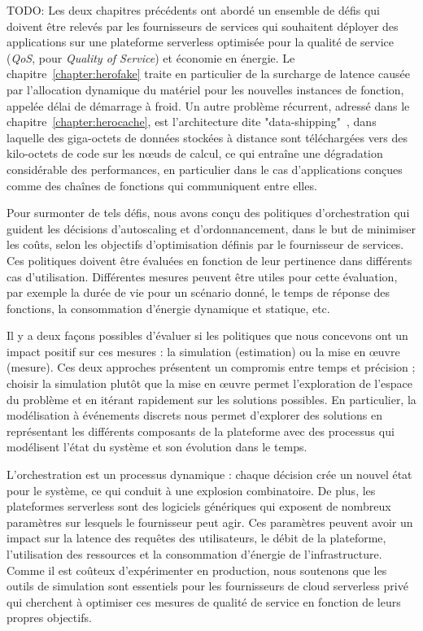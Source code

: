 TODO: Les deux chapitres précédents ont abordé un ensemble de défis qui doivent être relevés par les fournisseurs de services qui souhaitent déployer des applications sur une plateforme serverless optimisée pour la qualité de service (\textit{QoS}, pour \textit{Quality of Service}) et économie en énergie. Le chapitre~\ref{chapter:herofake} traite en particulier de la surcharge de latence causée par l'allocation dynamique du matériel pour les nouvelles instances de fonction, appelée délai de démarrage à froid. Un autre problème récurrent, adressé dans le chapitre~\ref{chapter:herocache}, est l'architecture dite "data-shipping"~\cite{yuFollowingDataNot}, dans laquelle des giga-octets de données stockées à distance sont téléchargées vers des kilo-octets de code sur les nœuds de calcul, ce qui entraîne une dégradation considérable des performances, en particulier dans le cas d'applications conçues comme des chaînes de fonctions qui communiquent entre elles.

Pour surmonter de tels défis, nous avons conçu des politiques d'orchestration qui guident les décisions d'autoscaling et d'ordonnancement, dans le but de minimiser les coûts, selon les objectifs d'optimisation définis par le fournisseur de services. Ces politiques doivent être évaluées en fonction de leur pertinence dans différents cas d'utilisation. Différentes mesures peuvent être utiles pour cette évaluation, par exemple la durée de vie pour un scénario donné, le temps de réponse des fonctions, la consommation d'énergie dynamique et statique, etc.

Il y a deux façons possibles d'évaluer si les politiques que nous concevons ont un impact positif sur ces mesures : la simulation (estimation) ou la mise en œuvre (mesure). Ces deux approches présentent un compromis entre temps et précision ; choisir la simulation plutôt que la mise en œuvre permet l'exploration de l'espace du problème et en itérant rapidement sur les solutions possibles. En particulier, la modélisation à événements discrets nous permet d'explorer des solutions en représentant les différents composants de la plateforme avec des processus qui modélisent l'état du système et son évolution dans le temps.

L'orchestration est un processus dynamique : chaque décision crée un nouvel état pour le système, ce qui conduit à une explosion combinatoire. De plus, les plateformes serverless sont des logiciels génériques qui exposent de nombreux paramètres sur lesquels le fournisseur peut agir. Ces paramètres peuvent avoir un impact sur la latence des requêtes des utilisateurs, le débit de la plateforme, l'utilisation des ressources et la consommation d'énergie de l'infrastructure. Comme il est coûteux d'expérimenter en production, nous soutenons que les outils de simulation sont essentiels pour les fournisseurs de cloud serverless privé qui cherchent à optimiser ces mesures de qualité de service en fonction de leurs propres objectifs.

